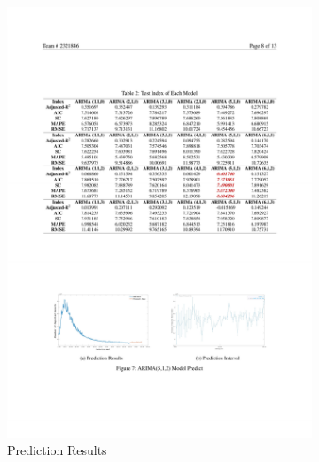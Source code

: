 \documentclass[12pt]{article}  %
\begin{document}
\begin{figure}[htbp]
\centering
\begin{subfigure}[b]{.49\textwidth}
\includegraphics[width=\textwidth]{img/yuanshi.pdf}\caption{Prediction Results}
\end{subfigure}
\begin{subfigure}[b]{.49\textwidth}

\end{subfigure}
\end{figure}
\end{document}
